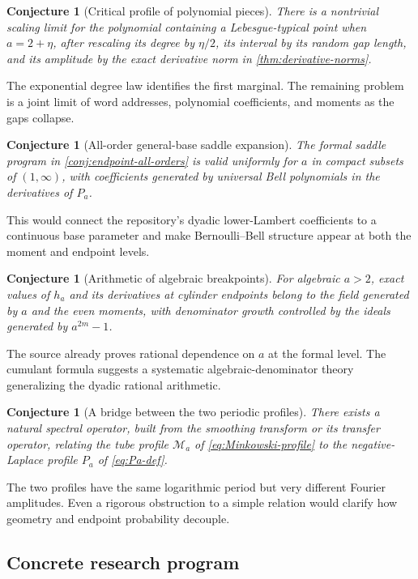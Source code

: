 \documentclass[11pt,oneside]{article}
\newtheorem{conjecture}[theorem]{Conjecture}
\theoremstyle{definition}
\theoremstyle{remark}
\begin{document}
\begin{conjecture}[Critical profile of polynomial pieces]
\label{conj:critical-profile}
There is a nontrivial scaling limit for the polynomial containing a Lebesgue-typical point
when $a=2+\eta$, after rescaling its degree by $\eta/2$, its interval by its random gap length,
and its amplitude by the exact derivative norm in \cref{thm:derivative-norms}.
\end{conjecture}
The exponential degree law identifies the first marginal.  The remaining problem is a joint
limit of word addresses, polynomial coefficients, and moments as the gaps collapse.

\begin{conjecture}[All-order general-base saddle expansion]
The formal saddle program in \cref{conj:endpoint-all-orders} is valid uniformly for $a$ in
compact subsets of $(1,\infty)$, with coefficients generated by universal Bell polynomials in
the derivatives of $P_a$.
\end{conjecture}
This would connect the repository's dyadic lower-Lambert coefficients to a continuous base
parameter and make Bernoulli--Bell structure appear at both the moment and endpoint levels.

\begin{conjecture}[Arithmetic of algebraic breakpoints]
For algebraic $a>2$, exact values of $h_a$ and its derivatives at cylinder endpoints belong
to the field generated by $a$ and the even moments, with denominator growth controlled by
the ideals generated by $a^{2m}-1$.
\end{conjecture}
The source already proves rational dependence on $a$ at the formal level.  The cumulant
formula suggests a systematic algebraic-denominator theory generalizing the dyadic rational
arithmetic.

\begin{conjecture}[A bridge between the two periodic profiles]
There exists a natural spectral operator, built from the smoothing transform or its transfer
operator, relating the tube profile $\mathcal M_a$ of \eqref{eq:Minkowski-profile} to the
negative-Laplace profile $P_a$ of \eqref{eq:Pa-def}.
\end{conjecture}
The two profiles have the same logarithmic period but very different Fourier amplitudes.
Even a rigorous obstruction to a simple relation would clarify how geometry and endpoint
probability decouple.

\subsection*{Concrete research program}
\end{document}
